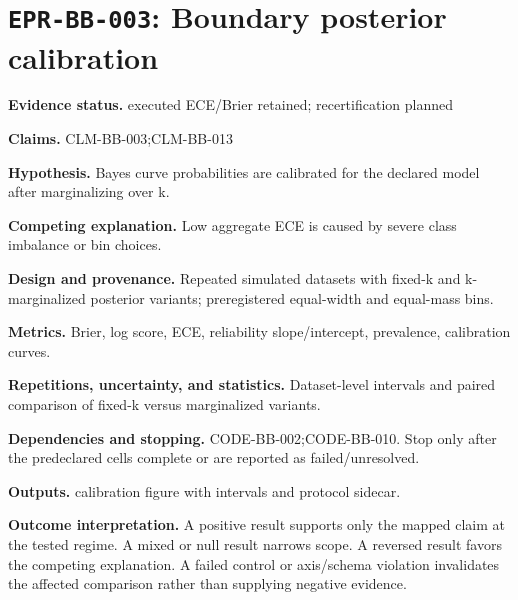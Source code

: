 \section[\texttt{EPR-BB-003}]{\texttt{EPR-BB-003}: Boundary posterior calibration}
\textbf{Evidence status.} executed ECE/Brier retained; recertification planned\par
\textbf{Claims.} CLM-BB-003;CLM-BB-013\par
\textbf{Hypothesis.} Bayes curve probabilities are calibrated for the declared model after marginalizing over k.\par
\textbf{Competing explanation.} Low aggregate ECE is caused by severe class imbalance or bin choices.\par
\textbf{Design and provenance.} Repeated simulated datasets with fixed-k and k-marginalized posterior variants; preregistered equal-width and equal-mass bins.\par
\textbf{Metrics.} Brier, log score, ECE, reliability slope/intercept, prevalence, calibration curves.\par
\textbf{Repetitions, uncertainty, and statistics.} Dataset-level intervals and paired comparison of fixed-k versus marginalized variants.\par
\textbf{Dependencies and stopping.} CODE-BB-002;CODE-BB-010. Stop only after the predeclared cells complete or are reported as failed/unresolved.\par
\textbf{Outputs.} calibration figure with intervals and protocol sidecar.\par
\textbf{Outcome interpretation.} A positive result supports only the mapped claim at the tested regime. A mixed or null result narrows scope. A reversed result favors the competing explanation. A failed control or axis/schema violation invalidates the affected comparison rather than supplying negative evidence.

